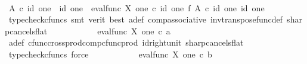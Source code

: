 \begin{isabellebody}
\ \ \ \ \isamarkupfalse%
\ {\isacharminus}{\kern0pt}\ \isanewline
\ \ \ \ \ \ \isamarkupfalse%
\ {\isachardoublequoteopen}A\isactrlsup {\isasymflat}\ {\isasymcirc}\isactrlsub c\ {\isasymlangle}id\ one\ {\isacharcomma}{\kern0pt}\ id\ one{\isasymrangle}\ {\isacharequal}{\kern0pt}\ {\isacharparenleft}{\kern0pt}eval{\isacharunderscore}{\kern0pt}func\ X\ one{\isacharparenright}{\kern0pt}\ {\isasymcirc}\isactrlsub c\ {\isacharparenleft}{\kern0pt}id\ one\ {\isasymtimes}\isactrlsub f\ {\isacharparenleft}{\kern0pt}A\isactrlsup {\isasymflat}{\isacharparenright}{\kern0pt}\isactrlsup {\isasymsharp}{\isacharparenright}{\kern0pt}\ {\isasymcirc}\isactrlsub c\ {\isasymlangle}id\ one{\isacharcomma}{\kern0pt}\ id\ one{\isasymrangle}{\isachardoublequoteclose}\isanewline
\ \ \ \ \ \ \ \ \isamarkupfalse%
\ {\isacharparenleft}{\kern0pt}typecheck{\isacharunderscore}{\kern0pt}cfuncs{\isacharcomma}{\kern0pt}\ smt\ {\isacharparenleft}{\kern0pt}verit{\isacharcomma}{\kern0pt}\ best{\isacharparenright}{\kern0pt}\ a{\isacharunderscore}{\kern0pt}def\ comp{\isacharunderscore}{\kern0pt}associative{}\ inv{\isacharunderscore}{\kern0pt}transpose{\isacharunderscore}{\kern0pt}func{\isacharunderscore}{\kern0pt}def{}\ sharp{\isacharunderscore}{\kern0pt}cancels{\isacharunderscore}{\kern0pt}flat{\isacharparenright}{\kern0pt}\isanewline
\ \ \ \ \ \ \isamarkupfalse%
\ \isamarkupfalse%
\ {\isachardoublequoteopen}{\isachardot}{\kern0pt}{\isachardot}{\kern0pt}{\isachardot}{\kern0pt}\ {\isacharequal}{\kern0pt}\ eval{\isacharunderscore}{\kern0pt}func\ X\ one\ {\isasymcirc}\isactrlsub c\ a{\isachardoublequoteclose}\isanewline
\ \ \ \ \ \ \ \ \isamarkupfalse%
\ a{\isacharunderscore}{\kern0pt}def\ cfunc{\isacharunderscore}{\kern0pt}cross{\isacharunderscore}{\kern0pt}prod{\isacharunderscore}{\kern0pt}comp{\isacharunderscore}{\kern0pt}cfunc{\isacharunderscore}{\kern0pt}prod\ id{\isacharunderscore}{\kern0pt}right{\isacharunderscore}{\kern0pt}unit{}\ sharp{\isacharunderscore}{\kern0pt}cancels{\isacharunderscore}{\kern0pt}flat\ \isamarkupfalse%
\ {\isacharparenleft}{\kern0pt}typecheck{\isacharunderscore}{\kern0pt}cfuncs{\isacharcomma}{\kern0pt}\ force{\isacharparenright}{\kern0pt}\isanewline
\ \ \ \ \ \ \isamarkupfalse%
\ \isamarkupfalse%
\ {\isachardoublequoteopen}{\isachardot}{\kern0pt}{\isachardot}{\kern0pt}{\isachardot}{\kern0pt}\ {\isacharequal}{\kern0pt}\ eval{\isacharunderscore}{\kern0pt}func\ X\ one\ {\isasymcirc}\isactrlsub c\ b{\isachardoublequoteclose}\isanewline

\end{isabellebody}

